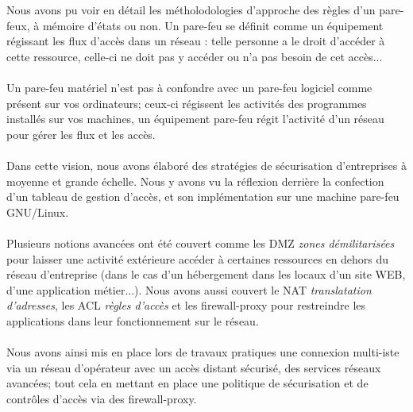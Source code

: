 Nous avons pu voir en détail les métholodologies d'approche des règles d'un pare-feux, à mémoire d'états ou non. Un pare-feu se définit comme un équipement régissant les flux d'accès dans un réseau : telle personne a le droit d'accéder à cette ressource, celle-ci ne doit pas y accéder ou n'a pas besoin de cet accès...
\\ \\
Un pare-feu matériel n'est pas à confondre avec un pare-feu logiciel comme présent sur vos ordinateurs; ceux-ci régissent les activités des programmes installés sur vos machines, un équipement pare-feu régit l'activité d'un réseau pour gérer les flux et les accès.
\\ \\
Dans cette vision, nous avons élaboré des stratégies de sécurisation d'entreprises à moyenne et grande échelle. Nous y avons vu la réflexion derrière la confection d'un tableau de gestion d'accès, et son implémentation sur une machine pare-feu GNU/Linux.
\\ \\
Plusieurs notions avancées ont été couvert comme les DMZ \textit{zones démilitarisées} pour laisser une activité extérieure accéder à certaines ressources en dehors du réseau d'entreprise (dans le cas d'un hébergement dans les locaux d'un site WEB, d'une application métier...). Nous avons aussi couvert le NAT \textit{translatation d'adresses}, les ACL \textit{règles d'accès} et les firewall-proxy pour restreindre les applications dans leur fonctionnement sur le réseau.
\\ \\
Nous avons ainsi mis en place lors de travaux pratiques une connexion multi-iste via un réseau d'opérateur avec un accès distant sécurisé, des services réseaux avancées; tout cela en mettant en place une politique de sécurisation et de contrôles d'accès via des firewall-proxy.